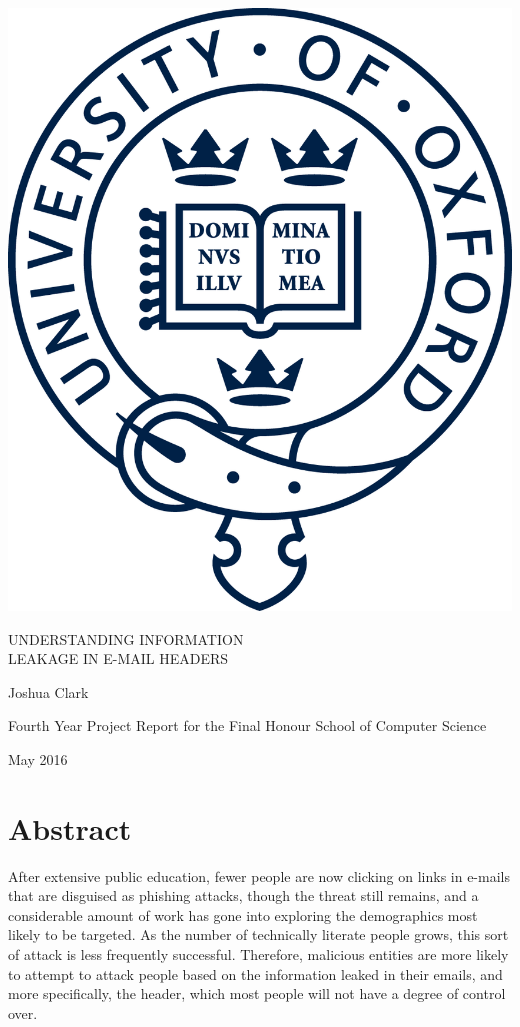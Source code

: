 \documentclass[a4paper,DIV=12,BCOR=7mm,abstract=yes,twoside,11pt]{scrreprt}
\author{Joshua Clark}
\begin{document}
\thispagestyle{empty}

\begin{center} \begin{minipage}[c]{0.75\linewidth} \centering %
\includegraphics[width=0.4\linewidth]{oxford}

\vspace{2cm} %
{\uppercase{\Large{}Understanding Information\\Leakage in E-Mail Headers}{\Large \par}} \vspace{2cm}
{\Large{}Joshua Clark}{\Large \par}

\vspace{2cm} %
{\Large{}Fourth Year Project Report for the Final Honour School of
Computer Science}{\Large \par}

\vspace{2cm} %
{\Large{}May 2016} %
\end{minipage} \par\end{center}

\cleardoublepage 
\chapter*{Abstract}

After extensive public education, fewer people are now clicking on links in
e-mails that are disguised as phishing attacks, though the threat still
remains, and a considerable amount of work has gone into exploring the
demographics most likely to be targeted.  As the number of technically literate
people grows, this sort of attack is less frequently successful.  Therefore,
malicious entities are more likely to attempt to attack people based on the
information leaked in their emails, and more specifically, the header, which
most people will not have a degree of control over.
\end{document}

